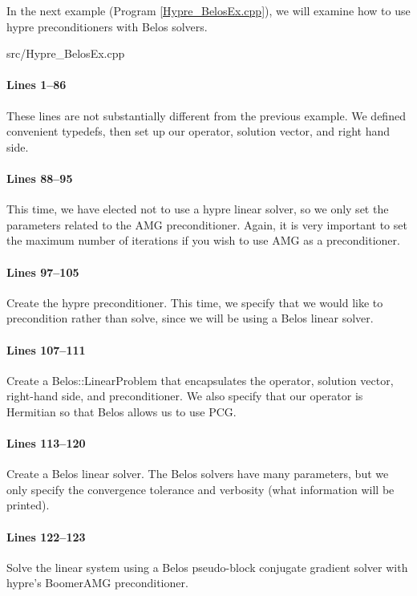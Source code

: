 In the next example (Program \ref{Hypre_BelosEx.cpp}), we will examine how to
use hypre preconditioners with Belos solvers.

\begin{lstinputlisting}[caption=Hypre\_BelosEx.cpp,label=Hypre_BelosEx.cpp]{src/Hypre_BelosEx.cpp}
\end{lstinputlisting}

\paragraph{Lines 1--86}
These lines are not substantially different from the previous example.  We
defined convenient typedefs, then set up our operator, solution vector, and
right hand side.

\paragraph{Lines 88--95}
This time, we have elected not to use a hypre linear solver, so we only set the
parameters related to the AMG preconditioner.  Again, it is very important to
set the maximum number of iterations if you wish to use AMG as a preconditioner.

\paragraph{Lines 97--105}
Create the hypre preconditioner.  This time, we specify that we would like to
precondition rather than solve, since we will be using a Belos linear solver.

\paragraph{Lines 107--111}
Create a Belos::LinearProblem that encapsulates the operator, solution vector,
right-hand side, and preconditioner.  We also specify that our operator is
Hermitian so that Belos allows us to use PCG.

\paragraph{Lines 113--120}
Create a Belos linear solver.  The Belos solvers have many parameters, but we
only specify the convergence tolerance and verbosity (what information will be
printed).

\paragraph{Lines 122--123}
Solve the linear system using a Belos pseudo-block conjugate gradient solver
with hypre's BoomerAMG preconditioner.